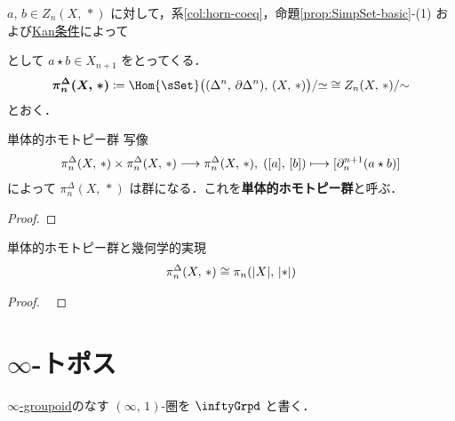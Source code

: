 \documentclass[TQFT_main]{subfiles}
\begin{document}
$a,\, b \in Z_n (X,\, *)$ に対して，系\ref{col:horn-coeq}，命題\ref{prop:SimpSet-basic}-(1) および\hyperref[def:infinity-1]{Kan条件}によって
\begin{center}
\end{center}
として $a \star b \in X_{n+1}$ をとってくる．
\begin{align}
    \bm{\pi^\Delta_n (X,\, *)} \coloneqq \Hom{\sSet} \bigl( (\Delta^n,\, \partial\Delta^n),\, (X,\, *) \bigr) / {\simeq} \cong Z_n (X,\, *) /{\sim}
\end{align}
とおく．

\begin{myprop}[label=def:simpi]{単体的ホモトピー群}
    写像
    \begin{align}
        \pi^\Delta_n (X,\, *) \times \pi^\Delta_n (X,\, *) \longrightarrow \pi^\Delta_n (X,\, *),\; ([a],\, [b]) \longmapsto [\partial^{n+1}_n (a \star b)]
    \end{align}
    によって $\pi^\Delta_n (X,\, *)$ は群になる．これを\textbf{単体的ホモトピー群}と呼ぶ．
\end{myprop}

\begin{proof}
    
\end{proof}

\begin{mytheo}[label=thm:homotopygrp]{単体的ホモトピー群と幾何学的実現}
    \begin{align}
        \pi^\Delta_n (X,\, *) \cong \pi_n (\abs{X},\, \abs{*})
    \end{align}
\end{mytheo}

\begin{proof}
    ~\cite[p.64, PROPOSITION 11.1]{goerss2009simplicial}
\end{proof}




\section{$\infty$-トポス}

\hyperref[def:infinity-1]{$\infty$-groupoid}のなす $(\infty,\, 1)$-圏を $\inftyGrpd$ と書く．
\end{document}
